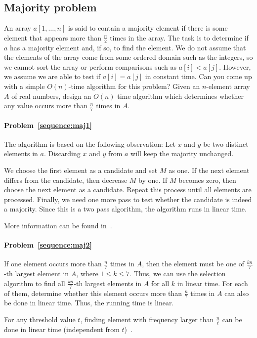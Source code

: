 \subsection{Majority problem}
\begin{Exercise}
\Question An array $a[1, \dots, n]$ is said to contain a majority element if there is some element that appears more than $\frac{n}{2}$ times in the array. The task is to determine if $a$ has a majority element and, if so, to find the element. We do not assume that the elements of the array come from some ordered domain such as the integers, so we cannot sort the array or perform comparisons such as $a[i] < a[j]$. However, we assume we are able to test if $a[i] = a[j]$ in constant time. Can you come up with a simple $O(n)$-time algorithm for this problem? \label{sequence:maj1} 
\Question Given an $n$-element array $A$ of real numbers, design an $O(n)$ time algorithm which determines whether any value occurs more than $\frac{n}{7}$ times in $A$. \label{sequence:maj2}
\end{Exercise}

\begin{Answer}
\paragraph{Problem~\ref{sequence:maj1}}
The algorithm is based on the following observation: Let $x$ and $y$ be two distinct elements in $a$. Discarding $x$ and $y$ from $a$ will keep the majority unchanged. 

We choose the first element as a candidate and set $M$ as one. If the next element differs from the candidate, then decrease $M$ by one. If $M$ becomes zero, then choose the next element as a candidate. Repeat this process until all elements are processed. Finally, we need one more pass to test whether the candidate is indeed a majority. Since this is a two pass algorithm, the algorithm runs in linear time.

\begin{remark}
More information can be found in~\cite{Misra1982}.
\end{remark}

\paragraph{Problem~\ref{sequence:maj2}}
If one element occurs more than $\frac{n}{7}$ times in $A$, then the element must be one of $\frac{kn}{7}$-th largest element in $A$, where $1 \leq k \leq 7$. Thus, we can use the selection algorithm to find all $\frac{kn}{7}$-th largest elements in $A$ for all $k$ in linear time. For each of them, determine whether this element occurs more than $\frac{n}{7}$ times in $A$ can also be done in linear time. Thus, the running time is linear.

\begin{remark}
For any threshold value $t$, finding element with frequency larger than $\frac{n}{t}$ can be done in linear time (independent from $t$)~\cite{Karp2003}.
\end{remark}
\end{Answer}

